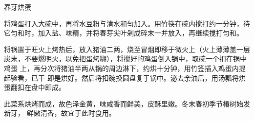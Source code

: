 %
%
%
%
%
%
%
\begin{recipe}{春芽烘蛋}

\ingredients


\preparation

\step 将鸡蛋打入大碗中，再将水豆粉与清水和匀加入。用竹筷在碗内搅打约一分钟，待
它匀和时，加入盐、味精，并将春芽尖叶剁成碎末一并放入，再继续搅打匀和。

\step 将锅置于旺火上烤热后，放入猪油二两，烧至冒烟即移于微火上（火上薄薄盖一层
炭末，不要燃明火，以免把蛋烤糊），将搅好的鸡蛋倒入锅中，取碗一个扣在锅中鸡蛋
上，再分次将猪油半两从锅的周边淋下，约烘十分钟，用竹签插入鸡蛋内提起验看，已干
即是烘好。然后将扣碗换圆盘复于锅中。泌去余油后，用汤瓢将烘蛋翻扣在盘中即成。

\features

此菜系烘烤而成，故色泽金黄，味咸香而鲜美，皮酥里嫩。冬末春初季节椿树始发新芽，
鲜嫩清香，故宜于此时食用。

\end{recipe}

